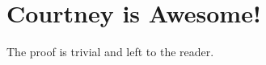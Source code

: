 \documentclass{amsart}
\begin{document}
\section{Courtney is Awesome!}

The proof is trivial and left to the reader.
\end{document}
